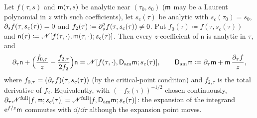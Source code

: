 \begin{prop}
\label{prop:row-P2}
Let $f(\tau,s)$ and $\mathsf{m}(\tau,s)$ be analytic near $(\tau_0,s_0)$ ($\mathsf{m}$ may be a Laurent polynomial in $z$ with such coefficients), let $s_c(\tau)$ be analytic with $s_c(\tau_0)=s_0$, $\partial_sf(\tau,s_c(\tau))=0$ and $f_2(\tau)\coloneqq\partial_s^2f(\tau,s_c(\tau))\neq0$. Put $f_0(\tau)\coloneqq f(\tau,s_c(\tau))$ and $\mathsf{n}(\tau)\coloneqq\mathscr{N}[f(\tau,\cdot),\mathsf{m}(\tau,\cdot);s_c(\tau)]$. Then every $z$-coefficient of $\mathsf{n}$ is analytic in $\tau$, and
\begin{equation}
\label{eq:row-P2}
\partial_\tau\mathsf{n}+\Big(\frac{f_{0,\tau}}{z}-\frac{f_{2,\tau}}{2f_2}\Big)\mathsf{n}=\mathscr{N}[f(\tau,\cdot),\mathsf{D}_{\mathrm{am}}\mathsf{m};s_c(\tau)],\qquad \mathsf{D}_{\mathrm{am}}\mathsf{m}\coloneqq\partial_\tau\mathsf{m}+\mathsf{m}\,\frac{\partial_\tau f}{z},
\end{equation}
where $f_{0,\tau}=(\partial_\tau f)(\tau,s_c(\tau))$ (by the critical-point condition) and $f_{2,\tau}$ is the total derivative of $f_2$. Equivalently, with $(-f_2(\tau))^{-1/2}$ chosen continuously, $\partial_\tau\mathscr{N}^{\mathrm{full}}[f,\mathsf{m};s_c(\tau)]=\mathscr{N}^{\mathrm{full}}[f,\mathsf{D}_{\mathrm{am}}\mathsf{m};s_c(\tau)]$: the expansion of the integrand $\mathrm{e}^{f/z}\mathsf{m}$ commutes with $\dd/\dd\tau$ although the expansion point moves.
\end{prop}

